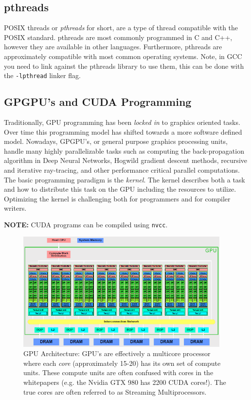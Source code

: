 \documentclass[twoside]{article}
\begin{document}


\subsection{pthreads}
POSIX threads or \textit{pthreads} for short, are a type of thread compatible with the POSIX standard. pthreads are most commonly programmed in C and C++, however they are available in other languages. Furthermore, pthreads are approximately compatible with most common operating systems. Note, in GCC you need to link against the pthreads library to use them, this can be done with the \texttt{-lpthread} linker flag.



\subsection{GPGPU's and CUDA Programming}
Traditionally, GPU programming has been \textit{locked in} to graphics oriented tasks. Over time this programming model has shifted towards a more software defined model. Nowadays, GPGPU's, or general purpose graphics processing units, handle many highly parallelizable tasks such as computing the back-propagation algorithm in Deep Neural Networks, Hogwild gradient descent methods, recursive and iterative ray-tracing, and other performance critical parallel computations. The basic programming paradigm is the \textit{kernel}. The kernel describes both a task and how to distribute this task on the GPU including the resources to utilize. Optimizing the kernel is challenging both for programmers and for compiler writers. 

\textbf{NOTE:} CUDA programs can be compiled using \texttt{nvcc}.

\begin{figure}[thbp]
  \centering
  \includegraphics[width=0.95\textwidth]{host-to-gpu}
  \caption{GPU Architecture: GPU's are effectively a multicore processor where each \textit{core} (approximately 15-20) has its own set of compute units. These compute units are often confused with cores in the whitepapers (e.g. the Nvidia GTX 980 has 2200 CUDA cores!). The true cores are often referred to as Streaming Multiprocessors.}
\end{figure}
\end{document}
